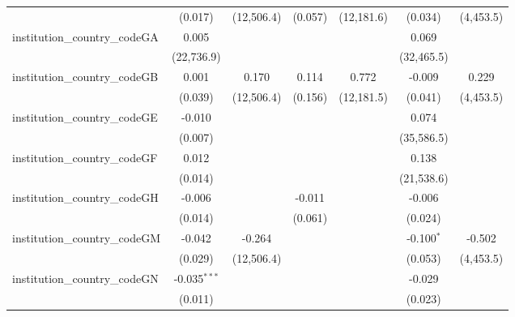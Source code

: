 \begin{tabular}{lcccccc}
                                         & (0.017)        & (12,506.4)    & (0.057)       & (12,181.6)    & (0.034)       & (4,453.5)\\   
   institution\_country\_codeGA          & 0.005          &               &               &               & 0.069         &   \\   
                                         & (22,736.9)     &               &               &               & (32,465.5)    &   \\   
   institution\_country\_codeGB          & 0.001          & 0.170         & 0.114         & 0.772         & -0.009        & 0.229\\   
                                         & (0.039)        & (12,506.4)    & (0.156)       & (12,181.5)    & (0.041)       & (4,453.5)\\   
   institution\_country\_codeGE          & -0.010         &               &               &               & 0.074         &   \\   
                                         & (0.007)        &               &               &               & (35,586.5)    &   \\   
   institution\_country\_codeGF          & 0.012          &               &               &               & 0.138         &   \\   
                                         & (0.014)        &               &               &               & (21,538.6)    &   \\   
   institution\_country\_codeGH          & -0.006         &               & -0.011        &               & -0.006        &   \\   
                                         & (0.014)        &               & (0.061)       &               & (0.024)       &   \\   
   institution\_country\_codeGM          & -0.042         & -0.264        &               &               & -0.100$^{*}$  & -0.502\\   
                                         & (0.029)        & (12,506.4)    &               &               & (0.053)       & (4,453.5)\\   
   institution\_country\_codeGN          & -0.035$^{***}$ &               &               &               & -0.029        &   \\   
                                         & (0.011)        &               &               &               & (0.023)       &   \\   

\end{tabular}
